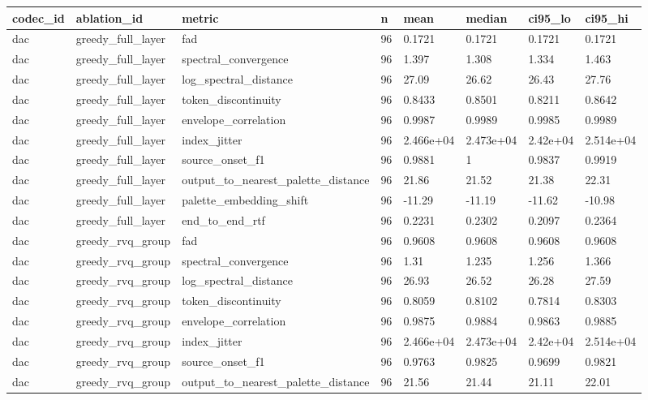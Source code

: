 \begin{table}[t]
\centering
\small
\begin{tabular}{llllllll}
\toprule
codec\_id & ablation\_id & metric & n & mean & median & ci95\_lo & ci95\_hi \\
\midrule
dac & greedy\_full\_layer & fad & 96 & 0.1721 & 0.1721 & 0.1721 & 0.1721 \\
dac & greedy\_full\_layer & spectral\_convergence & 96 & 1.397 & 1.308 & 1.334 & 1.463 \\
dac & greedy\_full\_layer & log\_spectral\_distance & 96 & 27.09 & 26.62 & 26.43 & 27.76 \\
dac & greedy\_full\_layer & token\_discontinuity & 96 & 0.8433 & 0.8501 & 0.8211 & 0.8642 \\
dac & greedy\_full\_layer & envelope\_correlation & 96 & 0.9987 & 0.9989 & 0.9985 & 0.9989 \\
dac & greedy\_full\_layer & index\_jitter & 96 & 2.466e+04 & 2.473e+04 & 2.42e+04 & 2.514e+04 \\
dac & greedy\_full\_layer & source\_onset\_f1 & 96 & 0.9881 & 1 & 0.9837 & 0.9919 \\
dac & greedy\_full\_layer & output\_to\_nearest\_palette\_distance & 96 & 21.86 & 21.52 & 21.38 & 22.31 \\
dac & greedy\_full\_layer & palette\_embedding\_shift & 96 & -11.29 & -11.19 & -11.62 & -10.98 \\
dac & greedy\_full\_layer & end\_to\_end\_rtf & 96 & 0.2231 & 0.2302 & 0.2097 & 0.2364 \\
dac & greedy\_rvq\_group & fad & 96 & 0.9608 & 0.9608 & 0.9608 & 0.9608 \\
dac & greedy\_rvq\_group & spectral\_convergence & 96 & 1.31 & 1.235 & 1.256 & 1.366 \\
dac & greedy\_rvq\_group & log\_spectral\_distance & 96 & 26.93 & 26.52 & 26.28 & 27.59 \\
dac & greedy\_rvq\_group & token\_discontinuity & 96 & 0.8059 & 0.8102 & 0.7814 & 0.8303 \\
dac & greedy\_rvq\_group & envelope\_correlation & 96 & 0.9875 & 0.9884 & 0.9863 & 0.9885 \\
dac & greedy\_rvq\_group & index\_jitter & 96 & 2.466e+04 & 2.473e+04 & 2.42e+04 & 2.514e+04 \\
dac & greedy\_rvq\_group & source\_onset\_f1 & 96 & 0.9763 & 0.9825 & 0.9699 & 0.9821 \\
dac & greedy\_rvq\_group & output\_to\_nearest\_palette\_distance & 96 & 21.56 & 21.44 & 21.11 & 22.01 \\

\end{tabular}
\end{table}
